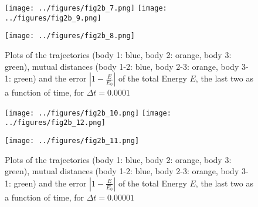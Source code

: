 \documentclass[12pt,a4paper]{article}
\newenvironment{code}{\captionsetup{type=listing}}{}
\begin{document}
\begin{enumerate}
		\begin{figure}[H]
			\begin{center}
				\begin{minipage}[c]{0.49\textwidth}
					\texttt{[image: ../figures/fig2b\_7.png]}
					\texttt{[image: ../figures/fig2b\_9.png]}
				\end{minipage}
				\begin{minipage}[t]{0.49\textwidth}
					\texttt{[image: ../figures/fig2b\_8.png]}
				\end{minipage}
			\end{center}
			\caption{Plots of the trajectories (body 1: blue, body 2: orange, body 3: green), mutual distances (body 1-2: blue, body 2-3: orange, body 3-1: green) and the error $\left| 1 - \frac{E}{E_0} \right|$ of the total Energy $E$, the last two as a function of time, for $\Delta t = 0.0001$}
		\end{figure}
		
		\begin{figure}[H]
			\begin{center}
				\begin{minipage}[c]{0.49\textwidth}
					\texttt{[image: ../figures/fig2b\_10.png]}
					\texttt{[image: ../figures/fig2b\_12.png]}
				\end{minipage}
				\begin{minipage}[t]{0.49\textwidth}
					\texttt{[image: ../figures/fig2b\_11.png]}
				\end{minipage}
			\end{center}
			\caption{Plots of the trajectories (body 1: blue, body 2: orange, body 3: green), mutual distances (body 1-2: blue, body 2-3: orange, body 3-1: green) and the error $\left| 1 - \frac{E}{E_0} \right|$ of the total Energy $E$, the last two as a function of time, for $\Delta t = 0.00001$}
		\end{figure}
		
		\newpage		
		
		\begin{code}
			\inputminted{text}{../out/minDistTimes_1.txt}
		\end{code}
		\begin{code}
			\inputminted{text}{../out/minDistTimes_2.txt}
		\end{code}
		\begin{code}
			\inputminted{text}{../out/minDistTimes_3.txt}
		\end{code}
		

\end{enumerate}
\end{document}

